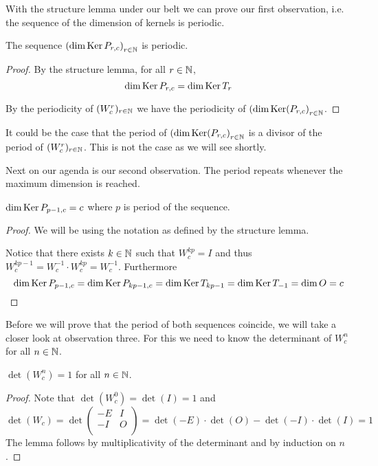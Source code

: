 With the structure lemma under our belt we can prove our first observation, i.e.
the sequence of the dimension of kernels is periodic.

\begin{proposition}[Observation 1]
  The sequence $\left(\dim \operatorname{Ker} P_{r,c}\right)_{r\in\mathbb{N}}$ is periodic.
\end{proposition}

\begin{proof}
  By the structure lemma, for all $r\in\mathbb{N}$,
  \[
  \dim\operatorname{Ker} P_{r,c}
  =
  \dim\operatorname{Ker} T_{r}
  \]

  By the periodicity of $(W_{c}^{r})_{r\in\mathbb{N}}$ we have the
  periodicity of $\left(\dim\operatorname{Ker}(P_{r,c}\right)_{r\in\mathbb{N}}$.
\end{proof}

It could be the case that the period of
$\left(\dim\operatorname{Ker}(P_{r,c}\right)_{r\in\mathbb{N}}$ is a divisor of the period of
$(W_{c}^{r})_{r\in\mathbb{N}}$. This is not the case as we will see shortly.

Next on our agenda is our second observation. The period repeats whenever the
maximum dimension is reached.

\begin{lemma}[Observation 2]
  $\dim\operatorname{Ker} P_{p-1,c} = c$ where $p$ is period of the sequence.
\end{lemma}

\begin{proof}
  We will be using the notation as defined by the structure lemma.

  Notice that there exists $k\in\mathbb{N}$ such that $W_{c}^{kp} = I$ and
  thus $W_{c}^{kp-1} = W_{c}^{-1} \cdot W_{c}^{kp} = W_{c}^{-1}$.
  Furthermore
  \[
  \dim\operatorname{Ker} P_{p-1,c}
  =
  \dim\operatorname{Ker} P_{kp-1,c}
  =
  \dim\operatorname{Ker} T_{kp-1}
  =
  \dim\operatorname{Ker} T_{-1}
  =
  \dim O
  = c
  \]
\end{proof}

Before we will prove that the period of both sequences coincide, we will take a
closer look at observation three. For this we need to know the determinant of
$W_{c}^{n}$ for all $n\in\mathbb{N}$.

\begin{lemma}
  $\det(W_{c}^{n}) = 1$ for all $n\in\mathbb{N}$.
\end{lemma}

\begin{proof}
  Note that $\det(W_{c}^{0}) = \det(I) = 1$ and
  \[
  \det(W_{c}) = \det
  \left(
  \begin{array}{cc}
    -E & I \\
    -I & O \\
  \end{array}
  \right)
  =
  \det(-E) \cdot \det(O) - \det(-I) \cdot \det(I)
  =
  1
  \]
  The lemma follows by multiplicativity of the determinant and
  by induction on $n$.
\end{proof}

